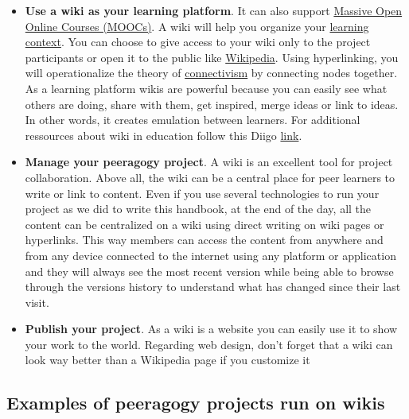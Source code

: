 \begin{itemize}
\item
  \textbf{Use a wiki as your learning platform}. It can also support
  \href{http://socialmediaclassroom.com/host/peeragogy/wiki/connectivism-practice-how-organize-a-mooc}{Massive
  Open Online Courses (MOOCs)}. A wiki will help you organize your
  \href{http://socialmediaclassroom.com/host/peeragogy/wiki/organizing-a-learning-context}{learning
  context}. You can choose to give access to your wiki only to the
  project participants or open it to the public like
  \href{http://www.wikipedia.org/}{Wikipedia}. Using hyperlinking, you
  will operationalize the theory of
  \href{http://en.wikipedia.org/wiki/Connectivism}{connectivism} by
  connecting nodes together. As a learning platform wikis are powerful
  because you can easily see what others are doing, share with them, get
  inspired, merge ideas or link to ideas. In other words, it creates
  emulation between learners. For additional ressources about wiki in
  education follow this Diigo
  \href{http://www.diigo.com/user/regisb/wiki\%20education}{link}.
\end{itemize}
\begin{itemize}
\item
  \textbf{Manage your peeragogy project}. A wiki is an excellent tool
  for project collaboration. Above all, the wiki can be a central place
  for peer learners to write or link to content. Even if you use several
  technologies to run your project as we did to write this handbook, at
  the end of the day, all the content can be centralized on a wiki using
  direct writing on wiki pages or hyperlinks. This way members can
  access the content from anywhere and from any device connected to the
  internet using any platform or application and they will always see
  the most recent version while being able to browse through the
  versions history to understand what has changed since their last
  visit.
\end{itemize}
\begin{itemize}
\item
  \textbf{Publish your project}. As a wiki is a website you can easily
  use it to show your work to the world. Regarding web design, don't
  forget that a wiki can look way better than a Wikipedia page if you
  customize it
\end{itemize}
\subsection{Examples of peeragogy projects run on wikis}

